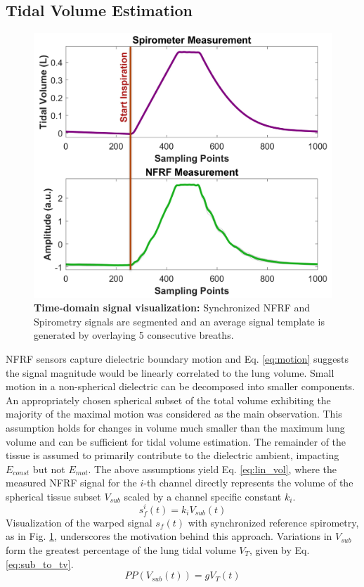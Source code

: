 \documentclass[journal]{IEEEtran}
\begin{document}
\subsection{Tidal Volume Estimation}
\begin{figure}[h]
\centering
\includegraphics[width=.48\textwidth]{ncs_spiro.jpg}
\caption{\textbf{Time-domain signal visualization:} Synchronized NFRF and Spirometry signals are segmented and an average signal template is generated by overlaying 5 consecutive breaths.}
\label{fig:ncs_spiro_time}
\end{figure}
NFRF sensors capture dielectric boundary motion and Eq. \ref{eq:motion} suggests the signal magnitude would be linearly correlated to the lung volume. Small motion in a non-spherical dielectric can be decomposed into smaller components. An appropriately chosen spherical subset of the total volume exhibiting the majority of the maximal motion was considered as the main observation. This assumption holds for changes in volume much smaller than the maximum lung volume and can be sufficient for tidal volume estimation. The remainder of the tissue is assumed to primarily contribute to the dielectric ambient, impacting $E_{const}$ but not $E_{mot}$. The above assumptions yield Eq. \ref{eq:lin_vol}, where the measured NFRF signal for the $i$-th channel directly represents the volume of the spherical tissue subset $V_{sub}$ scaled by a channel specific constant $k_i$. 
\begin{equation}
    s_f^{i}(t) = k_{i} V_{sub}(t)
    \label{eq:lin_vol}
\end{equation}
Visualization of the warped signal $s_f (t)$ with synchronized reference spirometry, as in Fig. \ref{fig:ncs_spiro_time}, underscores the motivation behind this approach. Variations in $V_{sub}$ form the greatest percentage of the lung tidal volume $V_{T}$, given by Eq. \ref{eq:sub_to_tv}. 
\begin{equation}
    PP(V_{sub} (t)) = g V_{T} (t)
    \label{eq:sub_to_tv}
\end{equation}
\end{document}
